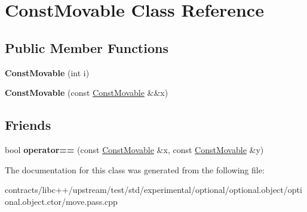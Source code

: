 \hypertarget{class_const_movable}{}\section{Const\+Movable Class Reference}
\label{class_const_movable}
\subsection*{Public Member Functions}
\begin{DoxyCompactItemize}
\item 
\mbox{\label{class_const_movable_aa197581e8d72f48f45d6fdc5861a2406}} 
{\bfseries Const\+Movable} (int i)
\item 
\mbox{\label{class_const_movable_a799476c4b6f0385d768a2337ef1dd268}} 
{\bfseries Const\+Movable} (const \mbox{\hyperlink{class_const_movable}{Const\+Movable}} \&\&x)
\end{DoxyCompactItemize}
\subsection*{Friends}
\begin{DoxyCompactItemize}
\item 
\mbox{\label{class_const_movable_a04d41d5c56cc8d4dee0f380f7f7b446a}} 
bool {\bfseries operator==} (const \mbox{\hyperlink{class_const_movable}{Const\+Movable}} \&x, const \mbox{\hyperlink{class_const_movable}{Const\+Movable}} \&y)
\end{DoxyCompactItemize}


The documentation for this class was generated from the following file\+:\begin{DoxyCompactItemize}
\item 
contracts/libc++/upstream/test/std/experimental/optional/optional.\+object/optional.\+object.\+ctor/move.\+pass.\+cpp\end{DoxyCompactItemize}
